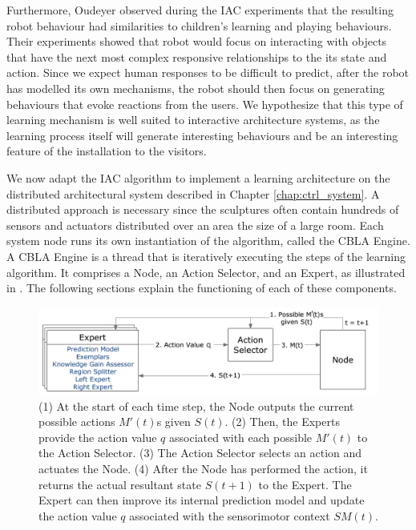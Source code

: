 Furthermore, Oudeyer \cite{Oudeyer2005} observed during the IAC experiments that the resulting robot behaviour had similarities to children's learning and playing behaviours. Their experiments showed that robot would focus on interacting with objects that have the next most complex responsive relationships to the its state and action. Since we expect human responses to be difficult to predict, after the robot has modelled its own mechanisms, the robot should then focus on generating behaviours that evoke reactions from the users. We hypothesize that this type of learning mechanism is well suited to interactive architecture systems, as the learning process itself will generate interesting behaviours and be an interesting feature of the installation to the visitors. 

We now adapt the IAC algorithm \cite{Oudeyer2007} to implement a learning architecture on the distributed architectural system described in Chapter \ref{chap:ctrl_system}. A distributed approach is necessary since the sculptures often contain hundreds of sensors and actuators distributed over an area the size of a large room. Each system node runs its own instantiation of the algorithm, called the CBLA Engine. A CBLA Engine is a thread that is iteratively executing the steps of the learning algorithm. It comprises a Node, an Action Selector, and an Expert, as illustrated in . The following sections explain the functioning of each of these components.

\begin{figure}[!htb]
	\centering
	\includegraphics[width=1.0 \textwidth]{"fig/cbla/Block Diagram CBLA"}
	\caption[Block diagram of the Curiosity-Based Learning Algorithm]{(1) At the start of each time step, the Node outputs the current possible actions $M'(t)$s given $S(t)$. (2) Then, the Experts provide the action value $q$ associated with each possible $M'(t)$ to the Action Selector. (3) The Action Selector selects an action and actuates the Node. (4) After the Node has performed the action, it returns the actual resultant state $S(t+1)$ to the Expert. The Expert can then improve its internal prediction model and update the action value $q$ associated with the sensorimotor context $SM(t)$. }
	\label{fig:Block Diagram CBLA}
\end{figure}


